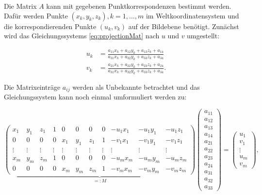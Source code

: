 
Die Matrix $A$ kann mit gegebenen Punktkorrespondenzen bestimmt werden. Dafür werden Punkte $(x_k,y_k, z_k), k = 1,\dotsc,m$ im Weltkoordinatensystem und die korrespondierenden Punkte $(u_k, v_k)$ auf der Bildebene benötigt.
Zunächst wird das Gleichungssystems \ref{eq:projectionMat} nach $u$ und $v$ umgestellt:

\[
 \begin{aligned}
 u_k &= \frac{a_{11} x_k +a_{12}y_k + a_{13}z_k + a_{14}}{a_{31} x_k +a_{32}y_k + a_{33}z_k + a_{34}} \\
 v_k &= \frac{a_{21} x_k +a_{22}y_k + a_{23}z_k + a_{24}}{a_{31} x_k +a_{32}y_k + a_{33}z_k + a_{34}}.
 \end{aligned}
\]

Die Matrixeinträge $a_{ij}$ werden als Unbekannte betrachtet und das Gleichungssystem kann noch einmal umformuliert werden zu:

 \setcounter{MaxMatrixCols}{20}
\begin{equation}\label{eq:DLT}
\underbrace{\begin{pmatrix}
x_1 & y_1 & z_1 & 1 & 0 & 0 & 0 & 0 & -u_1 x_1 & -u_1 y_1 & -u_1z_1 \\
0 & 0 & 0 & 0 & x_1 & y_1 & z_1 & 1 & -v_1x_1 & -v_1y_1 & -v_1z_1 \\
\vdots & \vdots & \vdots & \vdots & \vdots & \vdots & \vdots & \vdots & \vdots & \vdots & \vdots\\
x_m & y_m & z_m & 1 & 0 & 0 & 0 & 0 & -u_m x_m & -u_m y_m & -u_m z_m \\
0 & 0 & 0 & 0 & x_m & y_m & z_m & 1 & -v_mx_m & -v_my_m & -v_mz_m
\end{pmatrix}}_{=:M}
\begin{pmatrix}
a_{11} \\ a_{12} \\ a_{13} \\ a_{14} \\ a_{21} \\ a_{22} \\ a_{23} \\ a_{24} \\ a_{31} \\ a_{32} \\ a_{33}
\end{pmatrix} =
\begin{pmatrix}
u_1 \\ v_1 \\ \vdots \\ u_m \\ v_m
\end{pmatrix},
\end{equation}

